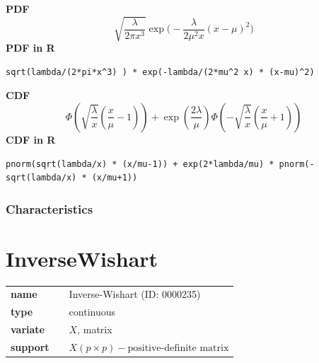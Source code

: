 \smallskip \noindent \hspace{.2cm} \textbf{PDF} 
\begin{equation*}\sqrt{\frac{\lambda}{2\pi x^3}} \exp\Big(-\frac{\lambda}{2\mu^2 x}(x-\mu)^2\Big)\end{equation*}
\smallskip \noindent \hspace{.2cm} \textbf{PDF in R}  
\begin{verbatim}sqrt(lambda/(2*pi*x^3) ) * exp(-lambda/(2*mu^2 x) * (x-mu)^2)\end{verbatim}
\smallskip \noindent \hspace{.2cm} \textbf{CDF} 
\begin{equation*}\Phi\left(\sqrt{\frac{\lambda}{x}} \left(\frac{x}{\mu}-1 \right)\right) +\exp\left(\frac{2 \lambda}{\mu}\right) \Phi\left(-\sqrt{\frac{\lambda}{x}}\left(\frac{x}{\mu}+1 \right)\right)\end{equation*}
\smallskip \noindent \hspace{.2cm} \textbf{CDF in R} 
\begin{verbatim}pnorm(sqrt(lambda/x) * (x/mu-1)) + exp(2*lambda/mu) * pnorm(-sqrt(lambda/x) * (x/mu+1))\end{verbatim}
\smallskip
\subsubsection*{Characteristics}
\smallskip
\section*{InverseWishart} 

  \bigskip 

\begin{tabular}{p{2cm}cl}
\textbf{name} & & Inverse-Wishart (ID: 0000235)\\ 
 
\textbf{type} & & continuous \\ 

\textbf{variate} & & $X$, matrix \\ 

\textbf{support} & & $X(p \times p) - \text{positive-definite matrix}$
\end{tabular}


